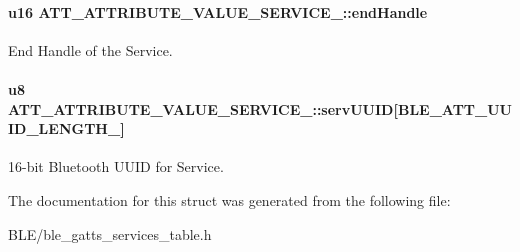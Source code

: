 \paragraph[{\texorpdfstring{end\+Handle}{endHandle}}]{\setlength{\rightskip}{0pt plus 5cm}u16 A\+T\+T\+\_\+\+A\+T\+T\+R\+I\+B\+U\+T\+E\+\_\+\+V\+A\+L\+U\+E\+\_\+\+S\+E\+R\+V\+I\+C\+E\+\_\+::end\+Handle}\hypertarget{struct_a_t_t___a_t_t_r_i_b_u_t_e___v_a_l_u_e___s_e_r_v_i_c_e__2_a7772be846616f32e4828156d563c4b74}{}\label{struct_a_t_t___a_t_t_r_i_b_u_t_e___v_a_l_u_e___s_e_r_v_i_c_e__2_a7772be846616f32e4828156d563c4b74}
End Handle of the Service. 
\paragraph[{\texorpdfstring{serv\+U\+U\+ID}{servUUID}}]{\setlength{\rightskip}{0pt plus 5cm}u8 A\+T\+T\+\_\+\+A\+T\+T\+R\+I\+B\+U\+T\+E\+\_\+\+V\+A\+L\+U\+E\+\_\+\+S\+E\+R\+V\+I\+C\+E\+\_\+::serv\+U\+U\+ID\mbox{[}{\bf B\+L\+E\+\_\+\+A\+T\+T\+\_\+\+U\+U\+I\+D\+\_\+\+L\+E\+N\+G\+T\+H\+\_}\mbox{]}}\hypertarget{struct_a_t_t___a_t_t_r_i_b_u_t_e___v_a_l_u_e___s_e_r_v_i_c_e__2_a09fc3ddabc7ff1e93b9f5b46a03d8966}{}\label{struct_a_t_t___a_t_t_r_i_b_u_t_e___v_a_l_u_e___s_e_r_v_i_c_e__2_a09fc3ddabc7ff1e93b9f5b46a03d8966}
16-\/bit Bluetooth U\+U\+ID for Service. 

The documentation for this struct was generated from the following file\+:\begin{DoxyCompactItemize}
\item 
B\+L\+E/ble\+\_\+gatts\+\_\+services\+\_\+table.\+h\end{DoxyCompactItemize}

